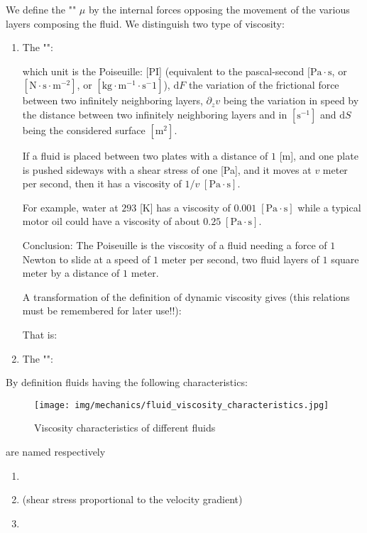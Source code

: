 	We define the "" $\mu$ by the internal forces opposing the movement of the various layers composing the fluid. We distinguish two type of viscosity:
	\begin{enumerate}
		\item The "":
		
		which unit is the Poiseuille: [PI] (equivalent to the pascal-second $[\text{Pa}\cdot\text{s}$, or $[\text{N}\cdot \text{s}\cdot \text{m}^{-2}]$, or $[\text{kg}\cdot\text{m}^{-1}\cdot\text{s}^-1]$), $\mathrm{d}F$ the variation of the frictional force between two infinitely neighboring layers, $\partial_z v$ being the variation in speed by the distance between two infinitely neighboring layers and in $[\text{s}^{-1}]$ and $\mathrm{d}S$ being the considered surface $[\text{m}^2]$.
		
		If a fluid is placed between two plates with a distance of $1$ [m], and one plate is pushed sideways with a shear stress of one [Pa], and it moves at $v$ meter per second, then it has a viscosity of $1/v\;[\text{Pa}\cdot\text{s}]$. 

		For example, water at $293$ [K] has a viscosity of $0.001\;[\text{Pa}\cdot\text{s}]$ while a typical motor oil could have a viscosity of about $0.25\;[\text{Pa}\cdot\text{s}]$.
		
		Conclusion: The Poiseuille is the viscosity of a fluid needing a force of $1$ Newton to slide at a speed of $1$ meter per second, two fluid layers of $1$ square meter by a distance of $1$ meter.
		
		A transformation of the definition of dynamic viscosity gives (this relations must be remembered for later use!!):
		
		That is:
		
 
		\item The "":
		
	\end{enumerate}
	By definition fluids having the following characteristics:
	\begin{figure}[H]
		\centering
		\texttt{[image: img/mechanics/fluid\_viscosity\_characteristics.jpg]}
		\caption{Viscosity characteristics of different fluids}
	\end{figure}
	are named respectively
	\begin{enumerate}
		\item {}
		\item {} (shear stress proportional to the velocity gradient)
		\item {}
	\end{enumerate}
